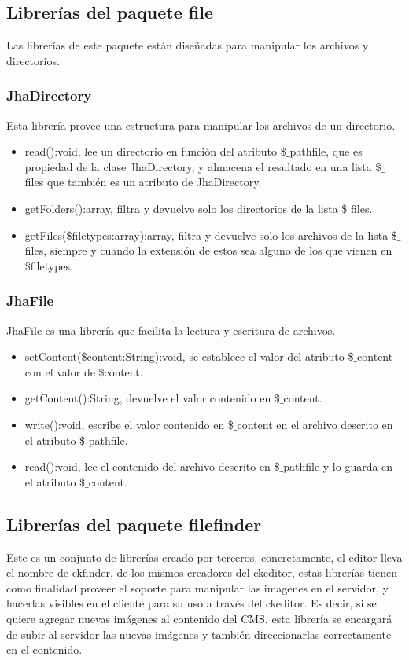 \subsection{Librer\'ias del paquete \textsf{file}}
Las librer\'ias de este paquete est\'an dise\~nadas para manipular los archivos y directorios.

\subsubsection{JhaDirectory}
Esta librer\'ia provee una estructura para manipular los archivos de un directorio.
\begin{itemize}
\item \textsf{read():void}, lee un directorio en funci\'on del atributo \textsf{\$$\_$pathfile}, que es propiedad de la clase JhaDirectory, y almacena el resultado en una lista \textsf{\$$\_$files} que tambi\'en es un atributo de JhaDirectory.
\item \textsf{getFolders():array}, filtra y devuelve solo los directorios de la lista \textsf{\$$\_$files}.
\item \textsf{getFiles(\$filetypes:array):array}, filtra y devuelve solo los archivos de la lista \textsf{\$$\_$files}, siempre y cuando la extensi\'on de estos sea alguno de los que vienen en \textsf{\$filetypes}.
\end{itemize}

\subsubsection{JhaFile}
JhaFile es una librer\'ia que facilita la lectura y escritura de archivos.
\begin{itemize}
\item \textsf{setContent(\$content:String):void}, se establece el valor del atributo \textsf{\$$\_$content} con el valor de \textsf{\$content}.
\item \textsf{getContent():String}, devuelve el valor contenido en \textsf{\$$\_$content}.
\item \textsf{write():void}, escribe el valor contenido en \textsf{\$$\_$content} en el archivo descrito en el atributo \textsf{\$$\_$pathfile}.
\item \textsf{read():void}, lee el contenido del archivo descrito en \textsf{\$$\_$pathfile} y lo guarda en el atributo \textsf{\$$\_$content}.
\end{itemize}

\subsection{Librer\'ias del paquete \textsf{filefinder}}
Este es un conjunto de librer\'ias creado por terceros, concretamente, el editor lleva el nombre de ckfinder, de los mismos creadores del ckeditor, estas librer\'ias tienen como finalidad proveer el soporte para manipular las imagenes en el servidor, y hacerlas visibles en el cliente para su uso a trav\'es del ckeditor. Es decir, si se quiere agregar nuevas im\'agenes al contenido del CMS, esta librer\'ia se encargar\'a de subir al servidor las nuevas im\'agenes y tambi\'en direccionarlas correctamente en el contenido.

